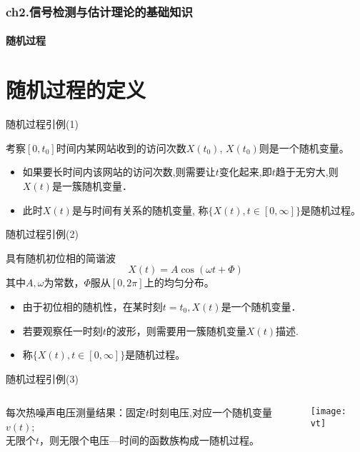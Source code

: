 \begin{frame}[shrink]
\frametitle{ch2.信号检测与估计理论的基础知识}
\framesubtitle{随机过程}
\tableofcontents[hideallsubsections]
\end{frame}

\section{随机过程的定义}

\begin{frame}{随机过程引例(1)}
\begin{example}
	考察$[0,t_0]$时间内某网站收到的访问次数$X(t_0)$, $X(t_0)$则是一个随机变量。
	\begin{itemize}
		\item 如果要长时间内该网站的访问次数,则需要让$t$变化起来,即$t$趋于无穷大,则$X(t)$是一簇随机变量．
		\item 此时$X(t)$是与时间有关系的随机变量, 称$\{X(t),t\in[0,\infty]\}$是随机过程。
	\end{itemize}	
\end{example}
\end{frame}

\begin{frame}{随机过程引例(2)}
\begin{example}
	具有随机初位相的简谐波
	\[X(t)=A\cos(\omega t+\Phi)\]
	其中$A,\omega$为常数，$\Phi$服从$[0,2\pi]$上的均匀分布。
	\begin{itemize}
		\item 由于初位相的随机性，在某时刻$t=t_0,X(t)$是一个随机变量．
		\item 若要观察任一时刻$t$的波形，则需要用一簇随机变量$X(t)$描述. 
		\item 称$\{X(t),t\in[0,\infty]\}$是随机过程。
	\end{itemize}	
\end{example}
\end{frame}

\begin{frame}{随机过程引例(3)}
\begin{columns}
	\begin{example}
		每次热噪声电压测量结果：固定$t$时刻电压,对应一个随机变量$v(t)$; \\
		无限个$t$，则无限个电压---时间的函数族构成一随机过程。
	\end{example}
	\texttt{[image: vt]}
\end{columns}
\end{frame}

